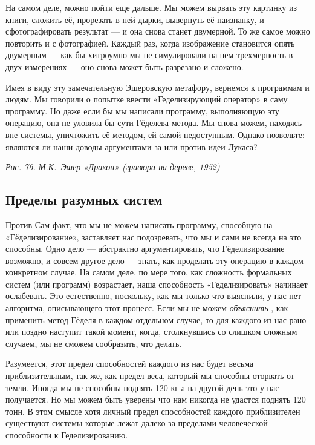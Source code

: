 \documentclass[../main.tex]{subfiles}
\begin{document}
На самом деле, можно пойти еще дальше. Мы можем вырвать эту картинку из книги, сложить её, прорезать в ней дырки, вывернуть её наизнанку, и сфотографировать результат --- и она снова станет двумерной. То же самое можно повторить и с фотографией. Каждый раз, когда изображение становится опять двумерным --- как бы хитроумно мы не симулировали на нем трехмерность в двух измерениях --- оно снова может быть разрезано и сложено.

Имея в виду эту замечательную Эшеровскую метафору, вернемся к программам и людям. Мы говорили о попытке ввести «Геделизирующий оператор» в саму программу. Но даже если бы мы написали программу, выполняющую эту операцию, она не уловила бы сути Гёделева метода. Мы снова можем, находясь вне системы, уничтожить её методом, ей самой недоступным. Однако позвольте: являются ли наши доводы аргументами за или против идеи Лукаса?

\emph{Рис. 76. М.К.~Эшер «Дракон» (гравюра на дереве, 1952)}


\subsection{Пределы разумных систем}

Против Сам факт, что мы не можем написать программу, способную на «Гёделизирование», заставляет нас подозревать, что мы и сами не всегда на это способны. Одно дело --- абстрактно аргументировать, что Гёделизирование возможно, и совсем другое дело --- знать, как проделать эту операцию в каждом конкретном случае. На самом деле, по мере того, как сложность формальных систем (или программ) возрастает, наша способность «Геделизировать» начинает ослабевать. Это естественно, поскольку, как мы только что выяснили, у нас нет алгоритма, описывающего этот процесс. Если мы не можем \emph{объяснить} , как применить метод Гёделя в каждом отдельном случае, то для каждого из нас рано или поздно наступит такой момент, когда, столкнувшись со слишком сложным случаем, мы не сможем сообразить, что делать.

Разумеется, этот предел способностей каждого из нас будет весьма приблизительным, так же, как предел веса, который мы способны оторвать от земли. Иногда мы не способны поднять 120 кг а на другой день это у нас получается. Но мы можем быть уверены что нам никогда не удастся поднять 120 тонн. В этом смысле хотя личный предел способностей каждого приблизителен существуют системы которые лежат далеко за пределами человеческой способности к Геделизированию.
\end{document}
